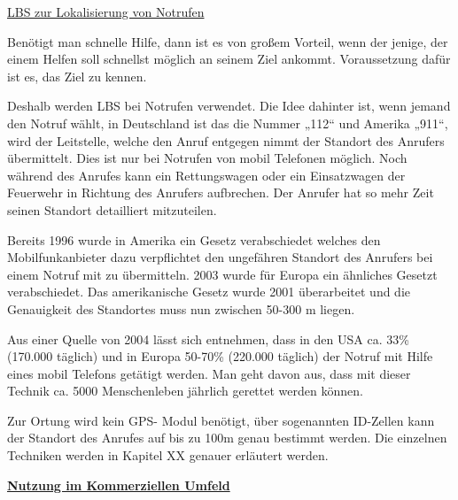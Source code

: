 \underline{LBS zur Lokalisierung von Notrufen}

Benötigt man schnelle Hilfe, dann ist es von großem Vorteil, wenn der jenige, der einem Helfen soll schnellst möglich an seinem Ziel ankommt. Voraussetzung dafür ist es, das Ziel zu kennen.

Deshalb werden LBS bei Notrufen verwendet. Die Idee dahinter ist, wenn jemand den Notruf wählt, in Deutschland ist das die Nummer „112“ und Amerika „911“, wird der Leitstelle, welche den Anruf entgegen nimmt der Standort des Anrufers übermittelt. Dies ist nur bei Notrufen von mobil Telefonen möglich. Noch während des Anrufes kann ein Rettungswagen oder ein Einsatzwagen der Feuerwehr in Richtung des Anrufers aufbrechen. Der Anrufer hat so mehr Zeit seinen Standort detailliert mitzuteilen.

Bereits 1996 wurde in Amerika ein Gesetz verabschiedet welches den Mobilfunkanbieter dazu verpflichtet den ungefähren Standort des Anrufers bei einem Notruf mit zu übermitteln.  2003 wurde für Europa ein ähnliches Gesetzt verabschiedet. Das amerikanische Gesetz wurde 2001 überarbeitet und die Genauigkeit des Standortes muss nun zwischen 50-300 m liegen.  

Aus einer Quelle von 2004 lässt sich entnehmen, dass in den USA ca. 33\% (170.000 täglich) und in Europa 50-70\% (220.000 täglich) der Notruf mit Hilfe eines mobil Telefons getätigt werden. Man geht davon aus, dass mit dieser Technik ca. 5000 Menschenleben jährlich gerettet werden können.

Zur Ortung wird kein GPS- Modul benötigt, über sogenannten ID-Zellen kann der Standort des Anrufes auf bis zu 100m genau bestimmt werden. Die einzelnen Techniken werden in Kapitel XX genauer erläutert werden. 


\textbf{ \underline{Nutzung im Kommerziellen Umfeld } }

